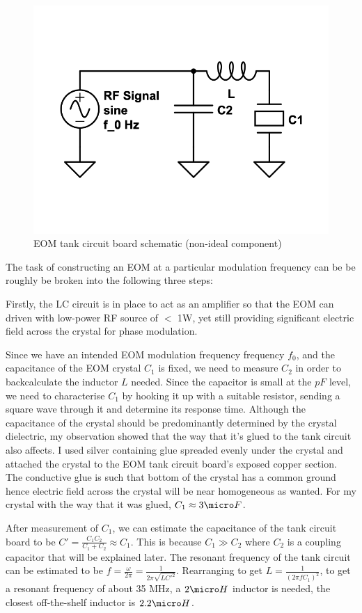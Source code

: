 \documentclass[11pt,A4Paper]{article}
\begin{document}
\begin{figure}[H]
    \centering
    \includegraphics[width=.5\textwidth]{eom-tank-cirucuit1.png}
    \caption{EOM tank circuit board schematic (non-ideal component)}
    \label{fig:eom-tank-cirucuit1}
\end{figure}

The task of constructing an EOM at a particular modulation frequency can be be roughly be broken into the following three steps:
\par
Firstly, the LC circuit is in place to act as an amplifier so that the EOM can driven with low-power RF source of $<$ 1W, yet still providing significant electric field across the crystal for phase modulation. 
\par
Since we have an intended EOM modulation frequency frequency $f_0$, and the capacitance of the EOM crystal $C_1$ is fixed, we need to measure $C_2$ in order to backcalculate the inductor $L$ needed. Since the capacitor is small at the $pF$ level, we need to characterise $C_1$ by hooking it up with a suitable resistor, sending a square wave through it and determine its response time. Although the capacitance of the crystal should be predominantly determined by the crystal dielectric, my observation showed that the way that it's glued to the tank circuit also affects. I used silver containing glue spreaded evenly under the crystal and attached the crystal to the EOM tank circuit board's exposed copper section. The conductive glue is such that bottom of the crystal has a common ground hence electric field across the crystal will be near homogeneous as wanted. For my crystal with the way that it was glued, $C_1 \approx 3 \micro F$.
\par
After measurement of $C_1$, we can estimate the capacitance of the tank circuit board to be $C' = \frac{C_1C_2}{C_1+C_2} \approx C_1$. This is because $C_1 \gg C_2$ where $C_2$ is a coupling capacitor that will be explained later. The resonant frequency of the tank circuit can be estimated to be $f = \frac{\omega}{2\pi} = \frac{1}{2\pi\sqrt{LC'^2}}$. Rearranging to get $L = \frac{1}{(2\pi f C_1)^2}$, to get a resonant frequency of about 35 MHz, a $2 \micro H$ inductor is needed, the closest off-the-shelf inductor is $2.2 \micro H$. 
\end{document}
